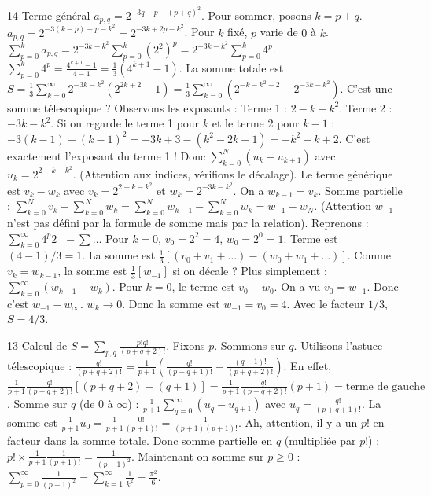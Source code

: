 \begin{correction}{14}
Terme général $a_{p,q} = 2^{-3q-p-(p+q)^{2}}$.
Pour sommer, posons $k=p+q$.
$a_{p,q} = 2^{-3(k-p)-p-k^2} = 2^{-3k+2p-k^2}$.
Pour $k$ fixé, $p$ varie de $0$ à $k$.
$\sum_{p=0}^k a_{p,q} = 2^{-3k-k^2} \sum_{p=0}^k (2^2)^p = 2^{-3k-k^2} \sum_{p=0}^k 4^p$.
$\sum_{p=0}^k 4^p = \frac{4^{k+1}-1}{4-1} = \frac{1}{3}(4^{k+1}-1)$.
La somme totale est $S = \frac{1}{3} \sum_{k=0}^\infty 2^{-3k-k^2} (2^{2k+2}-1) = \frac{1}{3} \sum_{k=0}^\infty (2^{-k-k^2+2} - 2^{-3k-k^2})$.
C'est une somme télescopique ?
Observons les exposants :
Terme 1 : $2 - k - k^2$.
Terme 2 : $-3k - k^2$.
Si on regarde le terme 1 pour $k$ et le terme 2 pour $k-1$ :
$-3(k-1)-(k-1)^2 = -3k+3-(k^2-2k+1) = -k^2-k+2$.
C'est exactement l'exposant du terme 1 !
Donc $\sum_{k=0}^N (u_k - u_{k+1})$ avec $u_k = 2^{2-k-k^2}$. (Attention aux indices, vérifions le décalage).
Le terme générique est $v_k - w_k$ avec $v_k = 2^{2-k-k^2}$ et $w_k = 2^{-3k-k^2}$.
On a $w_{k-1} = v_k$.
Somme partielle : $\sum_{k=0}^N v_k - \sum_{k=0}^N w_k = \sum_{k=0}^N w_{k-1} - \sum_{k=0}^N w_k = w_{-1} - w_N$.
(Attention $w_{-1}$ n'est pas défini par la formule de somme mais par la relation).
Reprenons :
$\sum_{k=0}^\infty 4^p 2^{\dots} - \sum \dots$
Pour $k=0$, $v_0 = 2^2=4$, $w_0 = 2^0=1$. Terme est $(4-1)/3 = 1$.
La somme est $\frac{1}{3} [ (v_0 + v_1 + \dots) - (w_0 + w_1 + \dots) ]$.
Comme $v_k = w_{k-1}$, la somme est $\frac{1}{3} [ w_{-1} ]$ si on décale ?
Plus simplement : $\sum_{k=0}^\infty (w_{k-1} - w_k)$.
Pour $k=0$, le terme est $v_0 - w_0$.
On a vu $v_0 = w_{-1}$. Donc c'est $w_{-1} - w_\infty$.
$w_k \to 0$. Donc la somme est $w_{-1} = v_0 = 4$.
Avec le facteur $1/3$, $S = 4/3$.
\end{correction}

\begin{correction}{13}
Calcul de $S = \sum_{p,q} \frac{p!q!}{(p+q+2)!}$.
Fixons $p$. Sommons sur $q$.
Utilisons l'astuce télescopique :
$\frac{q!}{(p+q+2)!} = \frac{1}{p+1} \left( \frac{q!}{(p+q+1)!} - \frac{(q+1)!}{(p+q+2)!} \right)$.
En effet, $\frac{1}{p+1} \frac{q!}{(p+q+2)!} [ (p+q+2) - (q+1) ] = \frac{1}{p+1} \frac{q!}{(p+q+2)!} (p+1) = \text{terme de gauche}$.
Somme sur $q$ (de 0 à $\infty$) :
$\frac{1}{p+1} \sum_{q=0}^\infty (u_q - u_{q+1})$ avec $u_q = \frac{q!}{(p+q+1)!}$.
La somme est $\frac{1}{p+1} u_0 = \frac{1}{p+1} \frac{0!}{(p+1)!} = \frac{1}{(p+1)(p+1)!}$.
Ah, attention, il y a un $p!$ en facteur dans la somme totale.
Donc somme partielle en $q$ (multipliée par $p!$) :
$p! \times \frac{1}{p+1} \frac{1}{(p+1)!} = \frac{1}{(p+1)^2}$.
Maintenant on somme sur $p \ge 0$ :
$\sum_{p=0}^\infty \frac{1}{(p+1)^2} = \sum_{k=1}^\infty \frac{1}{k^2} = \frac{\pi^2}{6}$.
\end{correction}

